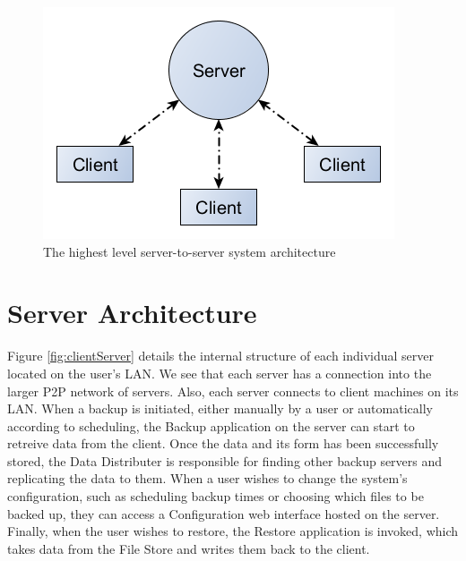\begin{figure}[hb]
\centering
\includegraphics[scale=0.5]{images/architechure-diagram-server-client3.png}
\caption{The highest level server-to-server system architecture}
\label{fig:indivNetwork}
\end{figure}

\clearpage


\section{Server Architecture}

Figure \ref{fig:clientServer} details the internal structure of each individual server located on the user's LAN.  We see that each server has a connection into the larger P2P network of servers.  Also, each server connects to client machines on its LAN.  When a backup is initiated, either manually by a user or automatically according to scheduling, the Backup application on the server can start to retreive data from the client. Once the data and its form has been successfully stored, the Data Distributer is responsible for finding other backup servers and replicating the data to them.  When a user wishes to change the system's configuration, such as scheduling backup times or choosing which files to be backed up, they can access a Configuration web interface hosted on the server.  Finally, when the user wishes to restore, the Restore application is invoked, which takes data from the File Store and writes them back to the client.


